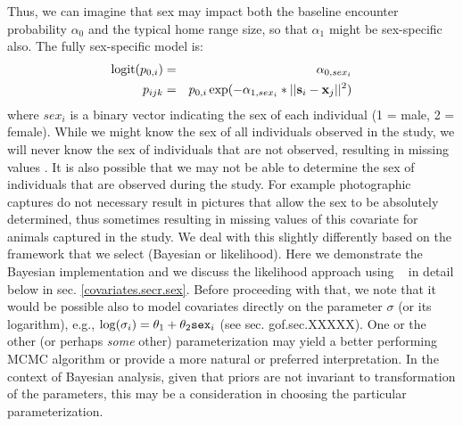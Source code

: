 Thus, we can imagine that sex may impact both the baseline encounter
probability $\alpha_{0}$ and the typical home range
size, so that
$\alpha_{1}$ might be sex-specific also.  The fully sex-specific model is:
\begin{eqnarray*}
\mbox{logit}(p_{0,i}) &= &\alpha_{0,sex_{i}}  \\
p_{ijk} &= &p_{0,i} \exp(- \alpha_{1, sex_{i}}*||{\bf s}_{i}-{\bf x}_{j}||^2)
\end{eqnarray*}
where $sex_{i}$ is a binary vector indicating the sex of
each individual (1 = male, 2 = female).  While we might know the sex of all
individuals observed in the study, we will never know the
sex of individuals that are not observed,
resulting in missing values \citep{gardner_etal:2010jwm}.
It is also possible that we may not be able to determine the sex of
individuals that are observed during the study. For example photographic
captures do not necessary result in pictures that allow the sex to be absolutely
determined, thus sometimes resulting in missing values of this covariate for animals
captured in the study.   We deal with this slightly differently based on the framework
that we select (Bayesian or likelihood).  Here we demonstrate the Bayesian implementation 
and we discuss the likelihood approach using \secr~ in detail
below in sec. \ref{covariates.secr.sex}.
Before proceeding with that, we note that it would be possible also to
model covariates directly on the parameter $\sigma$ (or its
logarithm), e.g., $\log(\sigma_{i}) = \theta_{1} + \theta_{2}
\mbox{\tt sex}_{i}$ (see sec. gof.sec.XXXXX). One or the other (or perhaps {\it some} other)
parameterization may yield a better performing MCMC algorithm or provide a
more natural or preferred interpretation.
In the context of Bayesian analysis, given that priors are not
invariant to transformation of the parameters, this may be a
consideration in choosing the particular parameterization.


